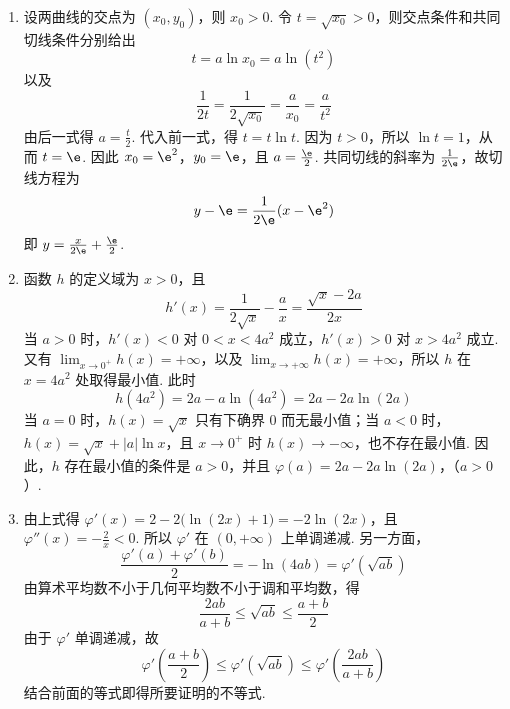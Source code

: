 \begin{solution}
\begin{enumerate}
\item 设两曲线的交点为 \((x_0,y_0)\)，则 \(x_0>0\). 令 \(t=\sqrt{x_0}>0\)，则交点条件和共同切线条件分别给出
\[
t=a\ln x_0=a\ln(t^2)
\]
以及
\[
\frac{1}{2t}=\frac{1}{2\sqrt{x_0}}=\frac{a}{x_0}=\frac{a}{t^2}
\]
由后一式得 \(a=\frac{t}{2}\). 代入前一式，得 \(t=t\ln t\). 因为 \(t>0\)，所以 \(\ln t=1\)，从而 \(t=\e\). 因此 \(x_0=\e^2\)，\(y_0=\e\)，且 \(a=\frac{\e}{2}\). 共同切线的斜率为 \(\frac{1}{2\e}\)，故切线方程为
\[
y-\e=\frac{1}{2\e}(x-\e^2)
\]
即 \(y=\frac{x}{2\e}+\frac{\e}{2}\).
\item 函数 \(h\) 的定义域为 \(x>0\)，且
\[
h'(x)=\frac{1}{2\sqrt{x}}-\frac{a}{x}=\frac{\sqrt{x}-2a}{2x}
\]
当 \(a>0\) 时，\(h'(x)<0\) 对 \(0<x<4a^2\) 成立，\(h'(x)>0\) 对 \(x>4a^2\) 成立. 又有 \(\displaystyle\lim_{x\to0^+}h(x)=+\infty\)，以及 \(\displaystyle\lim_{x\to+\infty}h(x)=+\infty\)，所以 \(h\) 在 \(x=4a^2\) 处取得最小值. 此时
\[
h(4a^2)=2a-a\ln(4a^2)=2a-2a\ln(2a)
\]
当 \(a=0\) 时，\(h(x)=\sqrt{x}\) 只有下确界 \(0\) 而无最小值；当 \(a<0\) 时，\(h(x)=\sqrt{x}+|a|\ln x\)，且 \(x\to0^+\) 时 \(h(x)\to-\infty\)，也不存在最小值. 因此，\(h\) 存在最小值的条件是 \(a>0\)，并且
\(\varphi(a)=2a-2a\ln(2a)\)，（\(a>0\)）.
\item 由上式得 \(\varphi'(x)=2-2\bigl(\ln(2x)+1\bigr)=-2\ln(2x)\)，且 \(\varphi''(x)=-\frac{2}{x}<0\).
所以 \(\varphi'\) 在 \((0,+\infty)\) 上单调递减. 另一方面，
\[
\frac{\varphi'(a)+\varphi'(b)}{2}=-\ln(4ab)=\varphi'(\sqrt{ab})
\]
由算术平均数不小于几何平均数不小于调和平均数，得
\[
\frac{2ab}{a+b}\leqslant\sqrt{ab}\leqslant\frac{a+b}{2}
\]
由于 \(\varphi'\) 单调递减，故
\[
\varphi'\left(\frac{a+b}{2}\right)\leqslant\varphi'(\sqrt{ab})\leqslant\varphi'\left(\frac{2ab}{a+b}\right)
\]
结合前面的等式即得所要证明的不等式.
\end{enumerate}
\end{solution}
